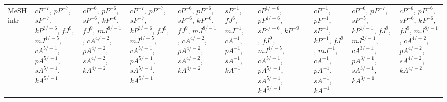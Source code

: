 \documentclass[letterpaper]{article} %
\begin{document}
\begin{sidewaystable*}
\begin{tabular}{l l l l l l l l l l l }
\multirow{10}{1.7cm}{MeSH intr} & \multirow{10}{1.7cm}{$cP^{-7}$, $pP^{-7}$, $sP^{-7}$, $kP^{3/-6}$, $fJ^{9}$, $mJ^{4/-5}$, $cA^{5/-1}$, $pA^{5/-1}$, $sA^{5/-1}$, $kA^{5/-1}$} & \multirow{10}{1.7cm}{$cP^{-6}$, $pP^{-6}$, $sP^{-6}$, $kP^{-6}$, $fJ^{9}$, $mJ^{8/-1}$, $cA^{4/-2}$, $pA^{4/-2}$, $sA^{4/-2}$, $kA^{4/-2}$} & \multirow{10}{1.7cm}{$cP^{-7}$, $pP^{-7}$, $sP^{-7}$, $kP^{3/-6}$, $fJ^{9}$, $mJ^{4/-5}$, $cA^{5/-1}$, $pA^{5/-1}$, $sA^{5/-1}$, $kA^{5/-1}$} & \multirow{10}{1.7cm}{$cP^{-6}$, $pP^{-6}$, $sP^{-6}$, $kP^{-6}$, $fJ^{9}$, $mJ^{8/-1}$, $cA^{4/-2}$, $pA^{4/-2}$, $sA^{4/-2}$, $kA^{4/-2}$} & \multirow{10}{1.7cm}{$sP^{-1}$, $fJ^{6}$, $mJ^{-1}$, $cA^{-1}$, $pA^{-1}$, $sA^{-1}$, $kA^{-1}$} & \multirow{10}{1.7cm}{$cP^{1/-6}$, $pP^{1/-6}$, $sP^{1/-6}$, $kP^{-9}$, $fJ^{9}$, $mJ^{4/-5}$, $cA^{5/-1}$, $pA^{5/-1}$, $sA^{5/-1}$, $kA^{5/-1}$} & \multirow{10}{1.7cm}{} & \multirow{10}{1.7cm}{$cP^{-1}$, $pP^{-1}$, $sP^{-1}$, $kP^{-1}$, $fJ^{9}$, $mJ^{-1}$, $cA^{-1}$, $pA^{-1}$, $sA^{-1}$, $kA^{-1}$} & \multirow{10}{1.7cm}{$cP^{-6}$, $pP^{-7}$, $sP^{-5}$, $kP^{1/-1}$, $fJ^{9}$, $mJ^{2/-1}$, $cA^{3/-1}$, $pA^{3/-1}$, $sA^{3/-1}$, $kA^{3/-1}$} & \multirow{10}{1.7cm}{$cP^{-6}$, $pP^{-6}$, $sP^{-6}$, $kP^{-6}$, $fJ^{9}$, $mJ^{8/-1}$, $cA^{4/-2}$, $pA^{4/-2}$, $sA^{4/-2}$, $kA^{4/-2}$} \\ \\ \\ \\ \\ \\ \\ \\ \\ \\
\midrule

\end{tabular}
\end{sidewaystable*}
\end{document}
